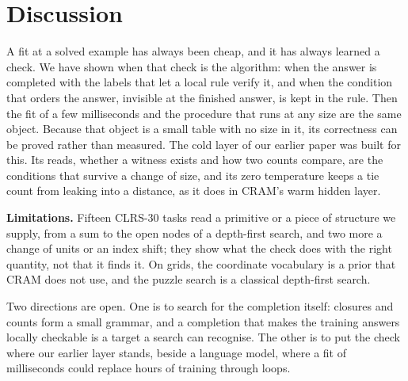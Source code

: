 \section{Discussion}\label{sec:discussion}

A fit at a solved example has always been cheap, and it has always learned a check. We have shown when that check is
the algorithm: when the answer is completed with the labels that let a local rule verify it, and when the condition that
orders the answer, invisible at the finished answer, is kept in the rule. Then the fit of a few milliseconds and the
procedure that runs at any size are the same object. Because that object is a small table with no size in it, its
correctness can be proved rather than measured. The cold layer of our earlier paper was built for this. Its reads,
whether a witness exists and how two counts compare, are the conditions that survive a change of size, and its zero
temperature keeps a tie count from leaking into a distance, as it does in CRAM's warm hidden layer.

\textbf{Limitations.} Fifteen CLRS-30 tasks read a primitive or a piece of structure we supply, from a sum to the open
nodes of a depth-first search, and two more a change of units or an index shift; they show what the check does with the
right quantity, not that it finds it. On grids, the coordinate vocabulary
is a prior that CRAM does not use, and the puzzle search is a classical depth-first search.

Two directions are open. One is to search for the completion itself: closures and counts form a small grammar, and a
completion that makes the training answers locally checkable is a target a search can recognise. The other is to put
the check where our earlier layer stands, beside a language model, where a fit of milliseconds could replace hours of
training through loops.
